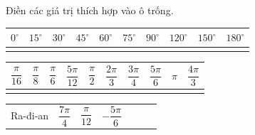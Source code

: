 \begin{bt}%

	Điền các giá trị thích hợp vào ô trống.
	\begin{center}
		\renewcommand{\arraystretch}{2}
		\begin{tabular}{|>{\centering\arraybackslash}m{1cm}|>{\centering\arraybackslash}m{1cm}|>{\centering\arraybackslash}m{1cm}|>{\centering\arraybackslash}m{1cm}|>{\centering\arraybackslash}m{1cm}|>{\centering\arraybackslash}m{1cm}|>{\centering\arraybackslash}m{1cm}|>{\centering\arraybackslash}m{1cm}|>{\centering\arraybackslash}m{1cm}|>{\centering\arraybackslash}m{1cm}|}
			\hline
			$0^\circ$ & $15^\circ$ & $30^\circ$ & $45^\circ$ & $60^\circ$ & $75^\circ$ & $90^\circ$ & $120^\circ$ & $150^\circ$ & $180^\circ$\\
			\hline
			&&&&&&&&&\\
			\hline
		\end{tabular}
	\end{center}
	\begin{center}
		\renewcommand{\arraystretch}{2}
		\begin{tabular}{|>{\centering\arraybackslash}m{1cm}|>{\centering\arraybackslash}m{1cm}|>{\centering\arraybackslash}m{1cm}|>{\centering\arraybackslash}m{1cm}|>{\centering\arraybackslash}m{1cm}|>{\centering\arraybackslash}m{1cm}|>{\centering\arraybackslash}m{1cm}|>{\centering\arraybackslash}m{1cm}|>{\centering\arraybackslash}m{1cm}|>{\centering\arraybackslash}m{1cm}|}
			\hline
			$\dfrac{\pi}{16}$ & $\dfrac{\pi}{8}$ & $\dfrac{\pi}{6}$ & $\dfrac{5\pi}{12}$ & $\dfrac{\pi}{2}$ & $\dfrac{2\pi}{3}$ & $\dfrac{3\pi}{4}$ & $\dfrac{5\pi}{6}$ & $\pi$ & $\dfrac{4\pi}{3}$\\
			\hline
			&&&&&&&&&\\
			\hline
		\end{tabular}
	\end{center}
	\begin{center}
		\renewcommand{\arraystretch}{2}
		\begin{tabular}{|>{\centering\arraybackslash}m{2cm}|>{\centering\arraybackslash}m{2cm}|>{\centering\arraybackslash}m{2cm}|>{\centering\arraybackslash}m{2cm}|>{\centering\arraybackslash}m{2cm}|>{\centering\arraybackslash}m{2cm}|>{\centering\arraybackslash}m{2cm}|}
			\hline
			Ra-đi-an & $\dfrac{7\pi}{4}$ & $\dfrac{\pi}{12}$ & $-\dfrac{5\pi}{6}$ & & & \\

\end{tabular}
\end{center}
\end{bt}
